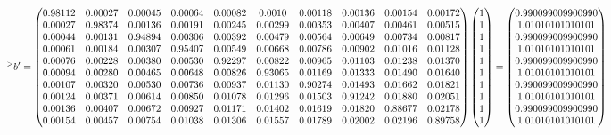 \documentclass[a4paper, 12pt]{extarticle}
\begin{document}
\begin{equation}
    \scalemath{0.8}{
        {^>b'} = \begin{pmatrix}
            0.98112 & 0.00027 & 0.00045 & 0.00064 & 0.00082 & 0.0010 & 0.00118 & 0.00136 & 0.00154 & 0.00172 \\ 
            0.00027 & 0.98374 & 0.00136 & 0.00191 & 0.00245 & 0.00299 & 0.00353 & 0.00407 & 0.00461 & 0.00515 \\ 
            0.00044 & 0.00131 & 0.94894 & 0.00306 & 0.00392 & 0.00479 & 0.00564 & 0.00649 & 0.00734 & 0.00817 \\ 
            0.00061 & 0.00184 & 0.00307 & 0.95407 & 0.00549 & 0.00668 & 0.00786 & 0.00902 & 0.01016 & 0.01128 \\ 
            0.00076 & 0.00228 & 0.00380 & 0.00530 & 0.92297 & 0.00822 & 0.00965 & 0.01103 & 0.01238 & 0.01370 \\ 
            0.00094 & 0.00280 & 0.00465 & 0.00648 & 0.00826 & 0.93065 & 0.01169 & 0.01333 & 0.01490 & 0.01640 \\ 
            0.00107 & 0.00320 & 0.00530 & 0.00736 & 0.00937 & 0.01130 & 0.90274 & 0.01493 & 0.01662 & 0.01821 \\ 
            0.00124 & 0.00371 & 0.00614 & 0.00850 & 0.01078 & 0.01296 & 0.01503 & 0.91242 & 0.01880 & 0.02051 \\ 
            0.00136 & 0.00407 & 0.00672 & 0.00927 & 0.01171 & 0.01402 & 0.01619 & 0.01820 & 0.88677 & 0.02178 \\ 
            0.00154 & 0.00457 & 0.00754 & 0.01038 & 0.01306 & 0.01557 & 0.01789 & 0.02002 & 0.02196 & 0.89758
        \end{pmatrix}
        \begin{pmatrix}
            1 \\ 
            1 \\ 
            1 \\ 
            1 \\ 
            1 \\ 
            1 \\ 
            1 \\ 
            1 \\ 
            1 \\ 
            1 
        \end{pmatrix}
        =
        \begin{pmatrix}
            0.990099009900990 \\ 
            1.01010101010101 \\ 
            0.990099009900990 \\ 
            1.01010101010101 \\ 
            0.990099009900990 \\ 
            1.01010101010101 \\ 
            0.990099009900990 \\ 
            1.01010101010101 \\ 
            0.990099009900990 \\ 
            1.01010101010101 \\ 
        \end{pmatrix}
    }
\end{equation}
\end{document}
